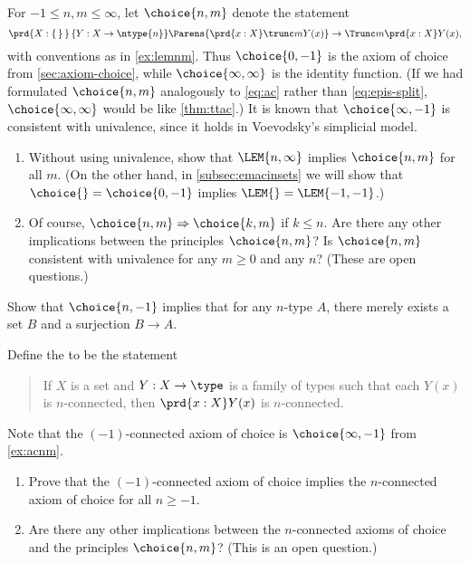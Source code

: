 \begin{ex}\label{ex:acnm}
  For $-1\le n,m\le\infty$, let $\choice{n,m}$ denote the statement
  \[ \prd{X:\set}{Y:X\to\ntype{n}}
  \Parens{\prd{x:X} \trunc m{Y(x)}}
  \to
  \Trunc m{\prd{x:X} Y(x)},
  \]
  with conventions as in \cref{ex:lemnm}.
  Thus $\choice{0,-1}$ is the axiom of choice from \cref{sec:axiom-choice},
  while $\choice{\infty,\infty}$ is the identity function.
  (If we had formulated $\choice{n,m}$ analogously to \eqref{eq:ac}
  rather than \eqref{eq:epis-split},
  $\choice{\infty,\infty}$ would be like \cref{thm:ttac}.)
  It is known that $\choice{\infty,-1}$ is consistent with univalence, since it holds in Voevodsky's simplicial model.
  \begin{enumerate}
  \item Without using univalence, show that $\LEM{n,\infty}$ implies $\choice{n,m}$ for all $m$.
    (On the other hand, in \cref{subsec:emacinsets} we will show that $\choice{}=\choice{0,-1}$ implies $\LEM{}=\LEM{-1,-1}$.)
  \item Of course, $\choice{n,m}\Rightarrow \choice{k,m}$ if $k\le n$.
    Are there any other implications between the principles $\choice{n,m}$?
    Is $\choice{n,m}$ consistent with univalence for any $m\ge 0$ and any $n$?
    (These are open questions.)
  \end{enumerate}
\end{ex}

\begin{ex}\label{ex:acnm-surjset}
  Show that $\choice{n,-1}$ implies that for any $n$-type $A$, there merely exists a set $B$ and a surjection $B\to A$.
\end{ex}

\begin{ex}\label{ex:acconn}
  Define the 
  to be the statement
  \begin{quote}
    If $X$ is a set and $Y:X\to \type$ is a family of types such that each $Y(x)$ is $n$-connected, then $\prd{x:X} Y(x)$ is $n$-connected.
  \end{quote}
  Note that the $(-1)$-connected axiom of choice is $\choice{\infty,-1}$ from \cref{ex:acnm}.
  \begin{enumerate}
  \item Prove that the $(-1)$-connected axiom of choice implies the $n$-con\-nect\-ed axiom of choice for all $n\ge -1$.
  \item Are there any other implications between the $n$-connected axioms of choice and the principles $\choice{n,m}$?
    (This is an open question.)
  \end{enumerate}
\end{ex}

